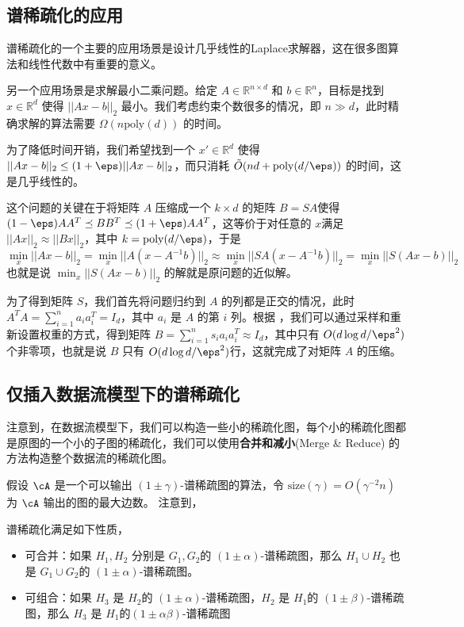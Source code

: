 \subsection{谱稀疏化的应用}
谱稀疏化的一个主要的应用场景是设计几乎线性的Laplace求解器，这在很多图算法和线性代数中有重要的意义。

另一个应用场景是求解最小二乘问题。给定 $A\in \mathbb{R}^{n\times d}$ 和 $b\in \mathbb{R}^{n}$，目标是找到 $x\in \mathbb{R}^{d}$ 使得 $||Ax-b||_2$ 最小。我们考虑约束个数很多的情况，即 $n\gg d$，此时精确求解的算法需要 $\Omega(n\mathrm{poly}(d))$ 的时间。

为了降低时间开销，我们希望找到一个 $x'\in \mathbb{R}^{d}$ 使得 $||Ax-b||_2 \leq (1+\eps)||Ax-b||_2$，而只消耗 $\Tilde{O}(nd+\mathrm{poly}(d/\eps))$ 的时间，这是几乎线性的。

这个问题的关键在于将矩阵 $A$ 压缩成一个 $k\times d$ 的矩阵 $B=SA$使得 $(1-\eps)AA^T\preceq BB^T \preceq (1+\eps)AA^T$，这等价于对任意的 $x$满足 $||Ax||_2\approx ||Bx||_2$，其中 $k=\mathrm{poly}(d/\eps)$，于是 
\[
\min_x ||Ax-b||_2 =\min_x ||A(x-A^{-1}b)||_2 \approx \min_x ||SA(x-A^{-1}b)||_2 = \min_x ||S(Ax-b)||_2 
\]
也就是说 $\min_x||S(Ax-b)||_2$ 的解就是原问题的近似解。

为了得到矩阵 $S$，我们首先将问题归约到 $A$ 的列都是正交的情况，此时 $A^TA = \sum_{i=1}^n a_i a_i^T = I_d$，其中 $a_i$ 是 $A$ 的第 $i$ 列。根据 ，我们可以通过采样和重新设置权重的方式，得到矩阵 $B=\sum_{i=1}^n s_i a_i a_i^T\approx I_d$，其中只有 $O(d\log d/\eps^2)$ 个非零项，也就是说 $B$ 只有 $O(d\log d/\eps^2)$行，这就完成了对矩阵 $A$ 的压缩。

\subsection{仅插入数据流模型下的谱稀疏化}
注意到，在数据流模型下，我们可以构造一些小的稀疏化图，每个小的稀疏化图都是原图的一个小的子图的稀疏化，我们可以使用\textbf{合并和减小}(Merge \& Reduce) 的方法构造整个数据流的稀疏化图。

假设 $\cA$ 是一个可以输出 $(1\pm\gamma)$-谱稀疏图的算法，令 $\text{size}(\gamma)=O(\gamma^{-2}n)$ 为 $\cA$ 输出的图的最大边数。
注意到，
\begin{proposition}
\label{prop:merge_reduce}
谱稀疏化满足如下性质，
\begin{itemize}
    \item 可合并：如果 $H_1,H_2$ 分别是 $G_1,G_2$的 $(1\pm\alpha)$-谱稀疏图，那么 $H_1\cup H_2$ 也是 $G_1\cup G_2$的 $(1\pm\alpha)$-谱稀疏图。
    \item 可组合：如果 $H_3$ 是 $H_2$的 $(1\pm\alpha)$-谱稀疏图，$H_2$ 是 $H_1$的 $(1\pm\beta)$-谱稀疏图，那么 $H_3$ 是 $H_1$的$(1\pm\alpha \beta)$-谱稀疏图
\end{itemize}
    
\end{proposition}

